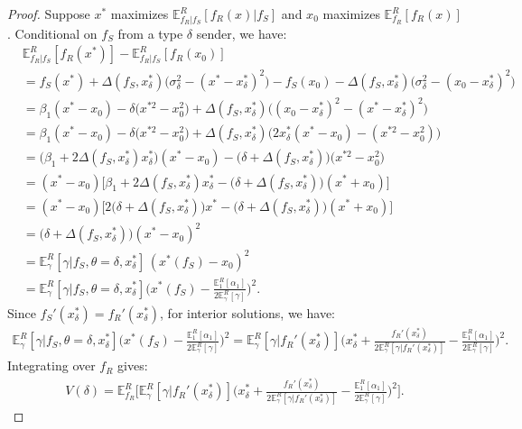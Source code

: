 \documentclass[11pt,dvipsnames]{article}
\begin{document}
\begin{appendix}
\begin{proof}
Suppose $x^*$ maximizes $\mathbb{E}_{f_R|f_S}^R[f_R(x)|f_S]$ and $x_0$ maximizes $\mathbb{E}_{f_R}^R[f_R(x)]$.
Conditional on $f_S$ from a type $\delta$ sender, we have:
\begin{align*}
&\mathbb{E}^R_{f_R|f_S}[f_R(x^*)] - \mathbb{E}^R_{f_R|f_S}[f_R(x_0)]\\
&= f_S(x^*) + \Delta(f_S,x_\delta^*)\big(\sigma_\delta^2-(x^*-x_\delta^*)^2\big) - f_S(x_0) - \Delta(f_S,x_\delta^*)\big(\sigma_\delta^2-(x_0-x_\delta^*)^2\big)\\
&= \beta_1(x^*-x_0) - \delta\big(x^{*2}-x_0^2\big) + \Delta(f_S,x_\delta^*)\big((x_0-x_\delta^*)^2-(x^*-x_\delta^*)^2\big)\\
&= \beta_1(x^*-x_0) - \delta\big(x^{*2}-x_0^2\big) + \Delta(f_S,x_\delta^*)\big(2x_\delta^*(x^*-x_0) - (x^{*2}-x_0^2)\big)\\
&= \big(\beta_1+2\Delta(f_S,x_\delta^*)x_\delta^*\big)(x^*-x_0) - \big(\delta+\Delta(f_S,x_\delta^*)\big)\big(x^{*2}-x_0^2\big)\\
&= (x^*-x_0)\Big[\beta_1+2\Delta(f_S,x_\delta^*)x_\delta^* - \big(\delta+\Delta(f_S,x_\delta^*)\big)(x^*+x_0)\Big]\\
&= (x^*-x_0)\Big[2\big(\delta+\Delta(f_S,x_\delta^*)\big)x^* - \big(\delta+\Delta(f_S,x_\delta^*)\big)(x^*+x_0)\Big]\\
&= \big(\delta+\Delta(f_S,x_\delta^*)\big)(x^*-x_0)^2\\
&= \mathbb{E}_\gamma^R[\gamma|f_S,\theta=\delta,x_\delta^*]\,(x^*(f_S)-x_0)^2
\\
&= \mathbb{E}_\gamma^R[\gamma|f_S,\theta=\delta,x_\delta^*]\bigg(x^*(f_S)-\frac{\mathbb{E}_1^R[\alpha_1]}{2\mathbb{E}_\gamma^R[\gamma]}\bigg)^2 .
\end{align*}
Since $f_S'(x_\delta^*) = f_R'(x_\delta^*)$, for interior solutions, we have:
\begin{align*}
\mathbb{E}_\gamma^R[\gamma|f_S,\theta=\delta,x_\delta^*]\bigg(x^*(f_S)-\frac{\mathbb{E}_1^R[\alpha_1]}{2\mathbb{E}_\gamma^R[\gamma]}\bigg)^2
= \mathbb{E}_\gamma^R[\gamma|f_R'(x_\delta^*)]\bigg(x_\delta^*+\frac{f_R'(x_\delta^*)}{2\mathbb{E}_\gamma^R[\gamma|f_R'(x_\delta^*)]}-\frac{\mathbb{E}_1^R[\alpha_1]}{2\mathbb{E}_\gamma^R[\gamma]}\bigg)^2.
\end{align*}
Integrating over $f_R$ gives:
\begin{align*}
V(\delta) = \mathbb{E}_{f_R}^R\Bigg[\mathbb{E}_\gamma^R[\gamma|f_R'(x_\delta^*)]\bigg(x_\delta^*+\frac{f_R'(x_\delta^*)}{2\mathbb{E}_\gamma^R[\gamma|f_R'(x_\delta^*)]}-\frac{\mathbb{E}_1^R[\alpha_1]}{2\mathbb{E}_\gamma^R[\gamma]}\bigg)^2\Bigg].
\end{align*}
\end{proof}


\end{appendix}
\end{document}
